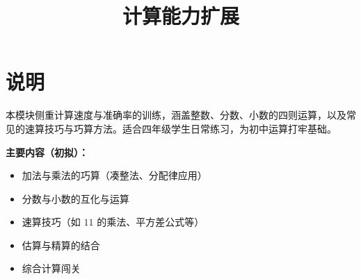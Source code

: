 \documentclass[a4paper,12pt]{ctexart}
\title{\textcolor{blue!70!black}{\Huge\textbf{计算能力扩展}}}
\author{}
\date{}
\begin{document}
\maketitle
\thispagestyle{empty}

\section*{\textcolor{blue!70!black}{说明}}

本模块侧重计算速度与准确率的训练，涵盖整数、分数、小数的四则运算，以及常见的速算技巧与巧算方法。适合四年级学生日常练习，为初中运算打牢基础。

\textbf{主要内容（初拟）：}
\begin{itemize}
  \item 加法与乘法的巧算（凑整法、分配律应用）
  \item 分数与小数的互化与运算
  \item 速算技巧（如 $11$ 的乘法、平方差公式等）
  \item 估算与精算的结合
  \item 综合计算闯关
\end{itemize}
\end{document}
